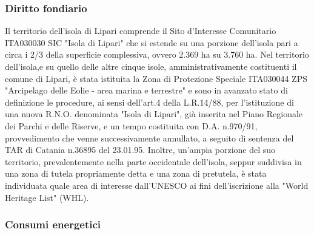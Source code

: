 \documentclass[fleqn,10pt]{SelfArx} %
\begin{document}
\subsubsection{Diritto fondiario}
Il territorio dell'isola di Lipari comprende il Sito d'Interesse Comunitario ITA030030 SIC "Isola di Lipari" che si estende su una porzione dell'isola pari a circa i 2/3 della superficie complessiva, ovvero 2.369 ha su 3.760 ha. Nel territorio dell'isola,e su quello delle altre cinque isole, amministrativamente costituenti il comune di Lipari, è stata istituita la Zona di Protezione Speciale ITA030044 ZPS "Arcipelago delle Eolie - area marina e terrestre" e sono in avanzato stato di definizione le procedure, ai sensi dell'art.4 della L.R.14/88, per l'istituzione di una nuova R.N.O. denominata "Isola di Lipari", già inserita nel Piano Regionale dei Parchi e delle Riserve, e un tempo costituita con D.A. n.970/91, provvedimento che venne successivamente annullato, a seguito di sentenza del TAR di Catania n.36895 del 23.01.95. 
Inoltre, un'ampia porzione del suo territorio, prevalentemente nella parte occidentale dell'isola, seppur suddivisa in una zona di tutela propriamente detta e una zona di pretutela, è stata individuata quale area di interesse dall'UNESCO ai fini dell'iscrizione alla "World Heritage List" (WHL). 

\subsubsection{Consumi energetici}
\end{document}
